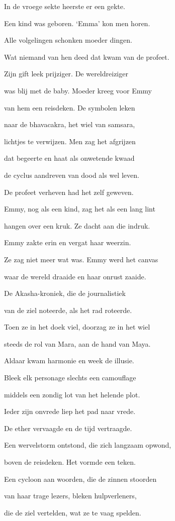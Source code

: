 In de vroege sekte
heerste er een gekte.

Een kind was geboren.
‘Emma’ kon men horen.

Alle volgelingen
schonken moeder dingen.

Wat niemand van hen deed
dat kwam van de profeet.

Zijn gift leek prijziger.
De wereldreiziger

was blij met de baby.
Moeder kreeg voor Emmy

van hem een reisdeken.
De symbolen leken

naar de bhavacakra,
het wiel van samsara,

lichtjes te verwijzen.
Men zag het afgrijzen

dat begeerte en haat
als onwetende kwaad

de cyclus aandreven
van dood als wel leven.

De profeet verheven
had het zelf geweven.

Emmy, nog als een kind,
zag het als een lang lint

hangen over een kruk.
Ze dacht aan die indruk.

Emmy zakte erin
en vergat haar weerzin.

Ze zag niet meer wat was.
Emmy werd het canvas

waar de wereld draaide
en haar onrust zaaide.

De Akasha-kroniek,
die de journalistiek

van de ziel noteerde,
als het rad roteerde.

Toen ze in het doek viel,
doorzag ze in het wiel

steeds de rol van Mara,
aan de hand van Maya.

Aldaar kwam harmonie
en week de illusie.

Bleek elk personage
slechts een camouflage

middels een zondig lot
van het helende plot.

Ieder zijn onvrede
liep het pad naar vrede.

De ether vervaagde
en de tijd vertraagde.

Een wervelstorm ontstond,
die zich langzaam opwond,

boven de reisdeken.
Het vormde een teken.

Een cycloon aan woorden,
die de zinnen stoorden

van haar trage lezers,
bleken hulpverleners,

die de ziel vertelden,
wat ze te vaag spelden.

